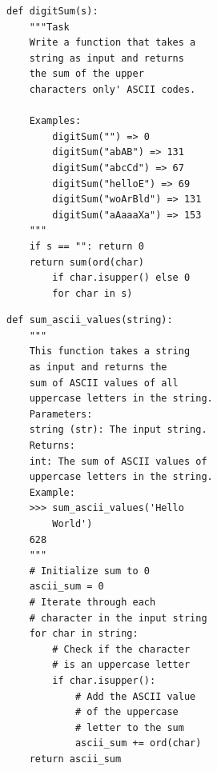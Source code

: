 \begin{tcolorbox}[title={CodeExercise-Python-27k Rephrased Sample}]

\begin{tcolorbox}[title={HumanEval test}, enhanced, colback=white, boxrule=1pt, sharp corners, boxsep=5pt, left=5pt, right=5pt, top=5pt, bottom=5pt]
\fontsize{8pt}{9.6pt}\selectfont
\begin{verbatim}
def digitSum(s):
    """Task
    Write a function that takes a 
    string as input and returns 
    the sum of the upper 
    characters only' ASCII codes.

    Examples:
        digitSum("") => 0
        digitSum("abAB") => 131
        digitSum("abcCd") => 67
        digitSum("helloE") => 69
        digitSum("woArBld") => 131
        digitSum("aAaaaXa") => 153
    """
    if s == "": return 0
    return sum(ord(char) 
        if char.isupper() else 0 
        for char in s)
\end{verbatim}
\end{tcolorbox}


\begin{tcolorbox}[title={CodeExercise-Python-27k}, enhanced, colback=white, boxrule=1pt, sharp corners, boxsep=5pt, left=5pt, right=5pt, top=5pt, bottom=5pt]
\fontsize{8pt}{9.6pt}\selectfont
\begin{verbatim}
def sum_ascii_values(string):
    """
    This function takes a string 
    as input and returns the 
    sum of ASCII values of all 
    uppercase letters in the string.
    Parameters:
    string (str): The input string.
    Returns:
    int: The sum of ASCII values of 
    uppercase letters in the string.
    Example:
    >>> sum_ascii_values('Hello 
        World')
    628
    """
    # Initialize sum to 0
    ascii_sum = 0
    # Iterate through each 
    # character in the input string
    for char in string:
        # Check if the character  
        # is an uppercase letter
        if char.isupper():
            # Add the ASCII value 
            # of the uppercase
            # letter to the sum
            ascii_sum += ord(char)
    return ascii_sum
\end{verbatim}
\end{tcolorbox}

\end{tcolorbox}



